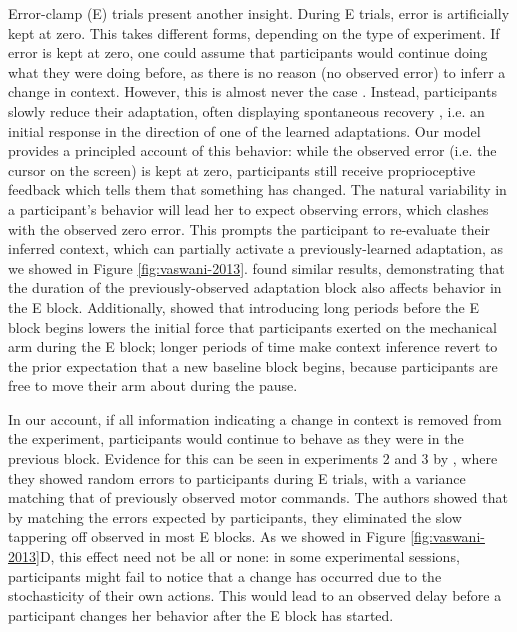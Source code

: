 \documentclass[a4paper,doc,floatsintext,natbib]{apa6}
\def \fref #1{Figure \ref{#1}}     %
\begin{document}
Error-clamp (E) trials present another insight. During E trials, error is artificially kept at zero. This takes different forms, depending on the type of experiment. If error is kept at zero, one could assume that participants would continue doing what they were doing before, as there is no reason (no observed error) to inferr a change in context. However, this is almost never the case \cite[e.g.][]{Smith_Interacting_2006,Ethier_Spontaneous_2008,Forano_Timescales_2020,Vaswani_Decay_2013,Scheidt_Persistence_2000,Pekny_Protection_2011}. Instead, participants slowly reduce their adaptation, often displaying spontaneous recovery \cite[e.g.][]{Smith_Interacting_2006}, i.e. an initial response in the direction of one of the learned adaptations. Our model provides a principled account of this behavior: while the observed error (i.e. the cursor on the screen) is kept at zero, participants still receive proprioceptive feedback which tells them that something has changed. The natural variability in a participant's behavior will lead her to expect observing errors, which clashes with the observed zero error. This prompts the participant to re-evaluate their inferred context, which can partially activate a previously-learned adaptation, as we showed in \fref{fig:vaswani-2013}. \cite{Pekny_Protection_2011} found similar results, demonstrating that the duration of the previously-observed adaptation block also affects behavior in the E block. Additionally, \cite{Criscimagna-Hemminger_Consolidation_2008} showed that introducing long periods before the E block begins lowers the initial force that participants exerted on the mechanical arm during the E block; longer periods of time make context inference revert to the prior expectation that a new baseline block begins, because participants are free to move their arm about during the pause.

In our account, if all information indicating a change in context is removed from the experiment, participants would continue to behave as they were in the previous block. Evidence for this can be seen in experiments 2 and 3 by \cite{Vaswani_Decay_2013}, where they showed random errors to participants during E trials, with a variance matching that of previously observed motor commands. The authors showed that by matching the errors expected by participants, they eliminated the slow tappering off observed in most E blocks. As we showed in \fref{fig:vaswani-2013}D, this effect need not be all or none: in some experimental sessions, participants might fail to notice that a change has occurred due to the stochasticity of their own actions. This would lead to an observed delay before a participant changes her behavior after the E block has started.
\end{document}
